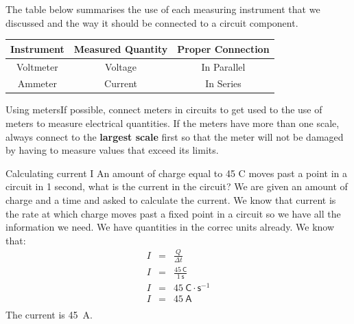 
The table below summarises the use of each measuring instrument
that we discussed and the way it should be connected to a circuit
component.

\begin{center}
\begin{tabular}{ | c | c | c | }
\hline 
\textbf{Instrument} & \textbf{Measured Quantity} & \textbf{Proper Connection} \\ \hline \hline 
Voltmeter & Voltage & In Parallel \\ \hline Ammeter &
Current & In Series \\ \hline
\hline
\end{tabular}
\end{center}


\begin{activity}{Using meters}If possible, 
connect meters in circuits to get used to the use of meters to
measure electrical quantities. If the meters have more than one
scale, always connect to the \textbf{largest scale} first so that the meter
will not be damaged by having to measure values that exceed its
limits.
\end{activity}



\begin{wex}{Calculating current I}
{An amount of charge equal to 45 C moves past a point in a circuit in 1 second, what is the current in the circuit?
}{%
We are given an amount of charge and a time and asked to calculate the current. We know that current is the rate at which charge moves past a fixed point in a circuit so we have all the information we need. We have quantities in the correc units already.
We know that:
\begin{eqnarray*}
I &=& \frac{Q}{\Delta t} \\
I &=& \frac{45~\mathsf{C}}{1~\mathsf{s}} \\
I &=& 45~\mathsf{C} \cdot \mathsf{s}^{-1} \\
I &=& 45~\mathsf{A} \\
\end{eqnarray*}
The current is 45~A.
}
\end{wex}

